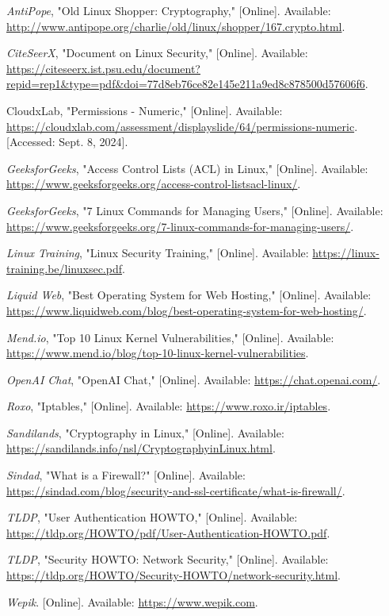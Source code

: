 \documentclass[conference]{IEEEtran}
\begin{document}
\begin{thebibliography}{99}
    \textit{AntiPope}, "Old Linux Shopper: Cryptography," [Online]. Available: \url{http://www.antipope.org/charlie/old/linux/shopper/167.crypto.html}.

    \textit{CiteSeerX}, "Document on Linux Security," [Online]. Available: \url{https://citeseerx.ist.psu.edu/document?repid=rep1&type=pdf&doi=77d8eb76ce82e145e211a9ed8c878500d57606f6}.

    CloudxLab, "Permissions - Numeric," [Online]. Available: \url{https://cloudxlab.com/assessment/displayslide/64/permissions-numeric}. [Accessed: Sept. 8, 2024].
    
    \textit{GeeksforGeeks}, "Access Control Lists (ACL) in Linux," [Online]. Available: \url{https://www.geeksforgeeks.org/access-control-listsacl-linux/}.
    
    \textit{GeeksforGeeks}, "7 Linux Commands for Managing Users," [Online]. Available: \url{https://www.geeksforgeeks.org/7-linux-commands-for-managing-users/}.
    
    \textit{Linux Training}, "Linux Security Training," [Online]. Available: \url{https://linux-training.be/linuxsec.pdf}.
    
    \textit{Liquid Web}, "Best Operating System for Web Hosting," [Online]. Available: \url{https://www.liquidweb.com/blog/best-operating-system-for-web-hosting/}.
    
    \textit{Mend.io}, "Top 10 Linux Kernel Vulnerabilities," [Online]. Available: \url{https://www.mend.io/blog/top-10-linux-kernel-vulnerabilities}.
    
    \textit{OpenAI Chat}, "OpenAI Chat," [Online]. Available: \url{https://chat.openai.com/}.
    
    \textit{Roxo}, "Iptables," [Online]. Available: \url{https://www.roxo.ir/iptables}.
    
    \textit{Sandilands}, "Cryptography in Linux," [Online]. Available: \url{https://sandilands.info/nsl/CryptographyinLinux.html}.
    
    \textit{Sindad}, "What is a Firewall?" [Online]. Available: \url{https://sindad.com/blog/security-and-ssl-certificate/what-is-firewall/}.
    
    \textit{TLDP}, "User Authentication HOWTO," [Online]. Available: \url{https://tldp.org/HOWTO/pdf/User-Authentication-HOWTO.pdf}.
    
    \textit{TLDP}, "Security HOWTO: Network Security," [Online]. Available: \url{https://tldp.org/HOWTO/Security-HOWTO/network-security.html}.
    
    \textit{Wepik}. [Online]. Available: \url{https://www.wepik.com}.
\end{thebibliography}
\end{document}
